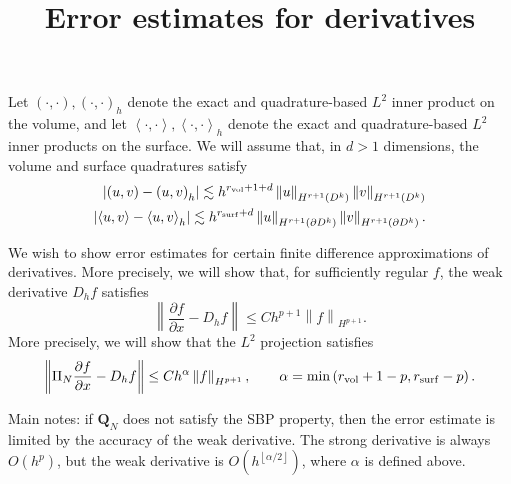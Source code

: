 \documentclass{article}
\date{}
\author{}
\title{Error estimates for derivatives}
\newcommand{\pd}[2]{\frac{\partial#1}{\partial#2}}
\newcommand{\nor}[1]{\left\| #1 \right\|}
\newcommand{\LRp}[1]{\left( #1 \right)}
\newcommand{\LRa}[1]{\left\langle #1 \right\rangle}
\newcommand{\LRb}[1]{\left| #1 \right|}
\begin{document}
Let $\LRp{\cdot,\cdot}, \LRp{\cdot,\cdot}_h$ denote the exact and quadrature-based $L^2$ inner product on the volume, and let $\LRa{\cdot,\cdot}, \LRa{\cdot,\cdot}_h$ denote the exact and quadrature-based $L^2$ inner products on the surface.  We will assume that, in $d > 1$ dimensions, the volume and surface quadratures satisfy
\begin{align*}
\LRb{\LRp{u,v} - \LRp{u,v}_h} \lesssim h^{r_{\rm vol}+1+d}  \nor{u}_{H^{r+1}\LRp{D^k}}\nor{v}_{H^{r+1}\LRp{D^k}}\\
\LRb{\LRa{u,v} - \LRa{u,v}_h} \lesssim h^{r_{\rm surf}+d} \nor{u}_{H^{r+1}\LRp{\partial D^k}}\nor{v}_{H^{r+1}\LRp{\partial D^k}}.
\end{align*}

We wish to show error estimates for certain finite difference approximations of derivatives.  More precisely, we will show that, for sufficiently regular $f$, the weak derivative $D_hf$ satisfies
\[
\nor{ \pd{f}{x} - {D}_h {f}}\leq Ch^{p+1} \nor{f}_{H^{p+1}}.
\]
More precisely, we will show that the $L^2$ projection satisfies
\[
\nor{ \Pi_N\pd{f}{x} - {D}_h {f}}\leq Ch^{\alpha} \nor{f}_{H^{p+1}}, \qquad \alpha = \min\LRp{r_{\rm vol} + 1 -p, r_{\rm surf} - p}.
\]

Main notes: if $\bm{Q}_N$ does not satisfy the SBP property, then the error estimate is limited by the accuracy of the weak derivative.  The strong derivative is always $O(h^p)$, but the weak derivative is $O\LRp{h^{\left\lfloor\alpha/2\right\rfloor}}$, where $\alpha$ is defined above.  
\end{document}
